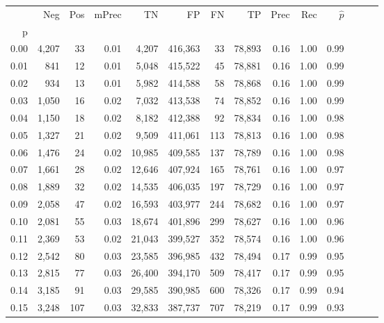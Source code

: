 \begin{tabular}{rrrrrrrrrrrrrr}
\toprule
{} &    Neg &    Pos & mPrec &       TN &       FP &      FN &      TP &  Prec &   Rec & $\hat{p}$ \\
p    &        &        &       &          &          &         &         &       &       &           \\
\midrule
0.00 &  4,207 &     33 &  0.01 &    4,207 &  416,363 &      33 &  78,893 &  0.16 &  1.00 &      0.99 \\
0.01 &    841 &     12 &  0.01 &    5,048 &  415,522 &      45 &  78,881 &  0.16 &  1.00 &      0.99 \\
0.02 &    934 &     13 &  0.01 &    5,982 &  414,588 &      58 &  78,868 &  0.16 &  1.00 &      0.99 \\
0.03 &  1,050 &     16 &  0.02 &    7,032 &  413,538 &      74 &  78,852 &  0.16 &  1.00 &      0.99 \\
0.04 &  1,150 &     18 &  0.02 &    8,182 &  412,388 &      92 &  78,834 &  0.16 &  1.00 &      0.98 \\
0.05 &  1,327 &     21 &  0.02 &    9,509 &  411,061 &     113 &  78,813 &  0.16 &  1.00 &      0.98 \\
0.06 &  1,476 &     24 &  0.02 &   10,985 &  409,585 &     137 &  78,789 &  0.16 &  1.00 &      0.98 \\
0.07 &  1,661 &     28 &  0.02 &   12,646 &  407,924 &     165 &  78,761 &  0.16 &  1.00 &      0.97 \\
0.08 &  1,889 &     32 &  0.02 &   14,535 &  406,035 &     197 &  78,729 &  0.16 &  1.00 &      0.97 \\
0.09 &  2,058 &     47 &  0.02 &   16,593 &  403,977 &     244 &  78,682 &  0.16 &  1.00 &      0.97 \\
0.10 &  2,081 &     55 &  0.03 &   18,674 &  401,896 &     299 &  78,627 &  0.16 &  1.00 &      0.96 \\
0.11 &  2,369 &     53 &  0.02 &   21,043 &  399,527 &     352 &  78,574 &  0.16 &  1.00 &      0.96 \\
0.12 &  2,542 &     80 &  0.03 &   23,585 &  396,985 &     432 &  78,494 &  0.17 &  0.99 &      0.95 \\
0.13 &  2,815 &     77 &  0.03 &   26,400 &  394,170 &     509 &  78,417 &  0.17 &  0.99 &      0.95 \\
0.14 &  3,185 &     91 &  0.03 &   29,585 &  390,985 &     600 &  78,326 &  0.17 &  0.99 &      0.94 \\
0.15 &  3,248 &    107 &  0.03 &   32,833 &  387,737 &     707 &  78,219 &  0.17 &  0.99 &      0.93 \\

\end{tabular}
